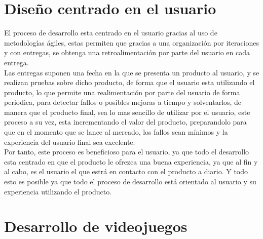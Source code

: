 \section{Diseño centrado en el usuario}
El proceso de desarrollo esta centrado en el usuario gracias al uso de metodologías ágiles, estas permiten que gracias a una organización por iteraciones y con entregas, se obtenga una retroalimentación por parte del usuario en cada entrega.\\

Las entregas suponen una fecha en la que se presenta un producto al usuario, y se realizan pruebas sobre dicho producto, de forma que el usuario esta utilizando el producto, lo que permite una realimentación por parte del usuario de forma periodica, para detectar fallos o posibles mejoras a tiempo y solventarlos, de manera que el producto final, sea lo mas sencillo de utilizar por el usuario, este proceso a su vez, esta incrementando el valor del producto, preparandolo para que en el momento que se lance al mercado, los fallos sean mínimos y la experiencia del usuario final sea excelente.\\

Por tanto, este proceso es beneficioso para el usuario, ya que todo el desarrollo esta centrado en que el producto le ofrezca una buena experiencia, ya que al fin y al cabo, es el usuario el que estrá en contacto con el producto a diario. Y todo esto es posible ya que todo el proceso de desarrollo está orientado al usuario y su experiencia utilizando el producto.

\section{Desarrollo de videojuegos}
